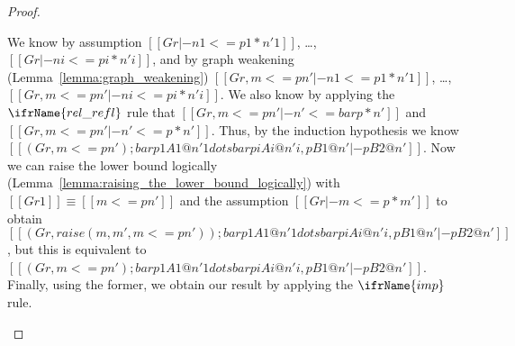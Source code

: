 \begin{proof}
\begin{itemize}
      We know by assumption $[[Gr |- n1 <= p1 * n'1]]$, \ldots, $[[Gr |- ni <= pi * n'i]]$, and by graph weakening 
      (Lemma~\ref{lemma:graph_weakening})
      $[[Gr, m <= p n' |- n1 <= p1 * n'1]]$, \ldots, $[[Gr, m <= p n' |- ni <= pi * n'i]]$.  We also know by
      applying the $\ifrName{rel\_refl}$ rule that $[[Gr, m <=p n' |- n' <= bar p * n']]$ and 
      $[[Gr, m <=p n' |- n' <= p * n']]$.  
      Thus, by the induction hypothesis we know 
      $[[(Gr, m <= p n') ; bar p1 A1 @ n'1 dots bar pi Ai @ n'i, p B1 @ n' |- p B2 @ n']]$.
      Now we can raise the lower bound logically (Lemma~\ref{lemma:raising_the_lower_bound_logically}) with 
      $[[Gr1]] \equiv [[m <=p n']]$ and the assumption $[[Gr |- m <=p * m']]$ to obtain \\
      $[[(Gr, raise(m, m', m <= p n')) ; bar p1 A1 @ n'1 dots bar pi Ai @ n'i, p B1 @ n' |- p B2 @ n']]$, but this is
      equivalent to $[[(Gr, m <= p n') ; bar p1 A1 @ n'1 dots bar pi Ai @ n'i, p B1 @ n' |- p B2 @ n']]$.  
      Finally, using the former, we obtain our result by applying the $\ifrName{imp}$ rule.



\end{itemize}
\end{proof}
